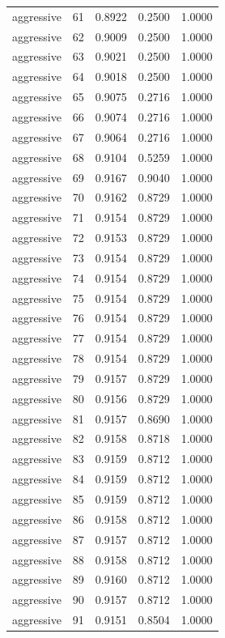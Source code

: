 \begin{tabular}{lrrrr}
aggressive & 61 & 0.8922 & 0.2500 & 1.0000 \\
aggressive & 62 & 0.9009 & 0.2500 & 1.0000 \\
aggressive & 63 & 0.9021 & 0.2500 & 1.0000 \\
aggressive & 64 & 0.9018 & 0.2500 & 1.0000 \\
aggressive & 65 & 0.9075 & 0.2716 & 1.0000 \\
aggressive & 66 & 0.9074 & 0.2716 & 1.0000 \\
aggressive & 67 & 0.9064 & 0.2716 & 1.0000 \\
aggressive & 68 & 0.9104 & 0.5259 & 1.0000 \\
aggressive & 69 & 0.9167 & 0.9040 & 1.0000 \\
aggressive & 70 & 0.9162 & 0.8729 & 1.0000 \\
aggressive & 71 & 0.9154 & 0.8729 & 1.0000 \\
aggressive & 72 & 0.9153 & 0.8729 & 1.0000 \\
aggressive & 73 & 0.9154 & 0.8729 & 1.0000 \\
aggressive & 74 & 0.9154 & 0.8729 & 1.0000 \\
aggressive & 75 & 0.9154 & 0.8729 & 1.0000 \\
aggressive & 76 & 0.9154 & 0.8729 & 1.0000 \\
aggressive & 77 & 0.9154 & 0.8729 & 1.0000 \\
aggressive & 78 & 0.9154 & 0.8729 & 1.0000 \\
aggressive & 79 & 0.9157 & 0.8729 & 1.0000 \\
aggressive & 80 & 0.9156 & 0.8729 & 1.0000 \\
aggressive & 81 & 0.9157 & 0.8690 & 1.0000 \\
aggressive & 82 & 0.9158 & 0.8718 & 1.0000 \\
aggressive & 83 & 0.9159 & 0.8712 & 1.0000 \\
aggressive & 84 & 0.9159 & 0.8712 & 1.0000 \\
aggressive & 85 & 0.9159 & 0.8712 & 1.0000 \\
aggressive & 86 & 0.9158 & 0.8712 & 1.0000 \\
aggressive & 87 & 0.9157 & 0.8712 & 1.0000 \\
aggressive & 88 & 0.9158 & 0.8712 & 1.0000 \\
aggressive & 89 & 0.9160 & 0.8712 & 1.0000 \\
aggressive & 90 & 0.9157 & 0.8712 & 1.0000 \\
aggressive & 91 & 0.9151 & 0.8504 & 1.0000 \\

\end{tabular}
